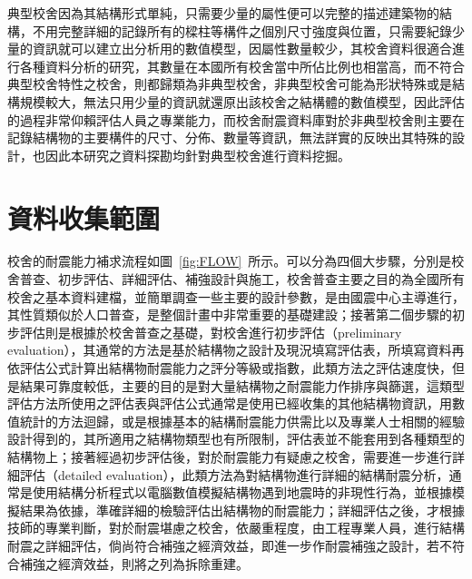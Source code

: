 典型校舍因為其結構形式單純，只需要少量的屬性便可以完整的描述建築物的結構，不用完整詳細的記錄所有的樑柱等構件之個別尺寸強度與位置，只需要紀錄少量的資訊就可以建立出分析用的數值模型，因屬性數量較少，其校舍資料很適合進行各種資料分析的研究，其數量在本國所有校舍當中所佔比例也相當高，而不符合典型校舍特性之校舍，則都歸類為非典型校舍，非典型校舍可能為形狀特殊或是結構規模較大，無法只用少量的資訊就還原出該校舍之結構體的數值模型，因此評估的過程非常仰賴評估人員之專業能力，而校舍耐震資料庫對於非典型校舍則主要在記錄結構物的主要構件的尺寸、分佈、數量等資訊，無法詳實的反映出其特殊的設計，也因此本研究之資料探勘均針對典型校舍進行資料挖掘。

\section{資料收集範圍}

校舍的耐震能力補求流程如圖~\ref{fig:FLOW}~所示。可以分為四個大步驟，分別是校舍普查、初步評估、詳細評估、補強設計與施工，校舍普查主要之目的為全國所有校舍之基本資料建檔，並簡單調查一些主要的設計參數，是由國震中心主導進行，其性質類似於人口普查，是整個計畫中非常重要的基礎建設；接著第二個步驟的初步評估則是根據於校舍普查之基礎，對校舍進行初步評估（preliminary evaluation），其通常的方法是基於結構物之設計及現況填寫評估表，所填寫資料再依評估公式計算出結構物耐震能力之評分等級或指數，此類方法之評估速度快，但是結果可靠度較低，主要的目的是對大量結構物之耐震能力作排序與篩選，這類型評估方法所使用之評估表與評估公式通常是使用已經收集的其他結構物資訊，用數值統計的方法迴歸，或是根據基本的結構耐震能力供需比以及專業人士相關的經驗設計得到的，其所適用之結構物類型也有所限制，評估表並不能套用到各種類型的結構物上；接著經過初步評估後，對於耐震能力有疑慮之校舍，需要進一步進行詳細評估（detailed evaluation），此類方法為對結構物進行詳細的結構耐震分析，通常是使用結構分析程式以電腦數值模擬結構物遇到地震時的非現性行為，並根據模擬結果為依據，準確詳細的檢驗評估出結構物的耐震能力；詳細評估之後，才根據技師的專業判斷，對於耐震堪慮之校舍，依嚴重程度，由工程專業人員，進行結構耐震之詳細評估，倘尚符合補強之經濟效益，即進一步作耐震補強之設計，若不符合補強之經濟效益，則將之列為拆除重建。



